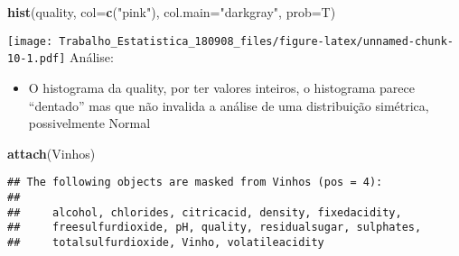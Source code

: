 \documentclass[]{article}
\newenvironment{Shaded}{\begin{snugshade}}{\end{snugshade}}
\newcommand{\KeywordTok}[1]{\textcolor[rgb]{0.13,0.29,0.53}{\textbf{#1}}}
\newcommand{\DataTypeTok}[1]{\textcolor[rgb]{0.13,0.29,0.53}{#1}}
\newcommand{\StringTok}[1]{\textcolor[rgb]{0.31,0.60,0.02}{#1}}
\newcommand{\NormalTok}[1]{#1}
\providecommand{\tightlist}{%
  \setlength{\itemsep}{0pt}\setlength{\parskip}{0pt}}
\begin{document}
\begin{Shaded}
\begin{Highlighting}[]
\KeywordTok{hist}\NormalTok{(quality, }\DataTypeTok{col=}\KeywordTok{c}\NormalTok{(}\StringTok{"pink"}\NormalTok{), }\DataTypeTok{col.main=}\StringTok{"darkgray"}\NormalTok{, }\DataTypeTok{prob=}\NormalTok{T)}
\end{Highlighting}
\end{Shaded}

\texttt{[image: Trabalho\_Estatistica\_180908\_files/figure-latex/unnamed-chunk-10-1.pdf]}
Análise:

\begin{itemize}
\tightlist
\item
  O histograma da quality, por ter valores inteiros, o histograma parece
  ``dentado'' mas que não invalida a análise de uma distribuição
  simétrica, possivelmente Normal
\end{itemize}

\begin{Shaded}
\begin{Highlighting}[]
\KeywordTok{attach}\NormalTok{(Vinhos)}
\end{Highlighting}
\end{Shaded}

\begin{verbatim}
## The following objects are masked from Vinhos (pos = 4):
## 
##     alcohol, chlorides, citricacid, density, fixedacidity,
##     freesulfurdioxide, pH, quality, residualsugar, sulphates,
##     totalsulfurdioxide, Vinho, volatileacidity
\end{verbatim}
\end{document}
